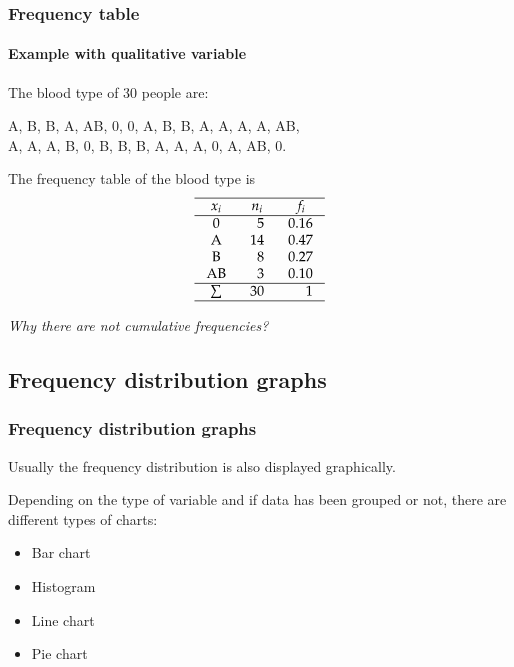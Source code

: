 \begin{frame}
\frametitle{Frequency table}
\framesubtitle{Example with qualitative variable}
The blood type of 30 people are:
\begin{center}
A, B, B, A, AB, 0, 0, A, B, B, A, A, A, A, AB,\\
A, A, A, B, 0, B, B, B, A, A, A, 0, A, AB, 0.
\end{center}
The frequency table of the blood type is 
\[
\setlength\arraycolsep{3mm}
\setlength\arrayrulewidth{0.5pt}
\begin{array}{crr}
\hline
\multicolumn{1}{c}{x_i} & \multicolumn{1}{c}{n_i} & \multicolumn{1}{c}{f_i} \\
\hline
\mbox{0} & 5 & 0.16 \\
\mbox{A} & 14 & 0.47 \\
\mbox{B} & 8 & 0.27 \\
\mbox{AB} & 3 & 0.10 \\
\hline
\sum & 30 & 1 \\
\hline
\end{array}
\]
\begin{center}
\emph{Why there are not cumulative frequencies?}
\end{center} 
\end{frame}


\subsection{Frequency distribution graphs}

\begin{frame}
\frametitle{Frequency distribution graphs}
Usually the frequency distribution is also displayed graphically.
 
Depending on the type of variable and if data has been grouped or not, there are different types of charts:
\begin{itemize}
\item Bar chart
\item Histogram
\item Line chart
\item Pie chart
\end{itemize}
\end{frame} 


